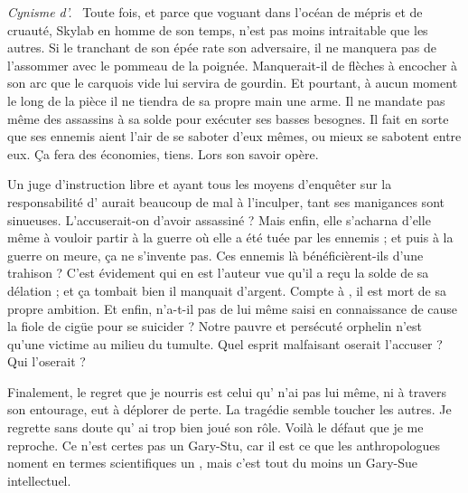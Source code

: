 {\em\normalsize Cynisme d’\elena{}.}~
Toute fois, et parce que voguant dans l’océan de mépris et de cruauté, \elena{} Skylab en homme de son temps, n’est pas moins intraitable que les autres. Si le tranchant de son épée rate son adversaire, il ne manquera pas de l’assommer avec le pommeau de la poignée. Manquerait-il de flèches à encocher à son arc que le carquois vide lui servira de gourdin. Et pourtant, à aucun moment le long de la pièce il ne tiendra de sa propre main une arme. Il ne mandate pas même des assassins à sa solde pour exécuter ses basses besognes. Il fait en sorte que ses ennemis aient l’air de se saboter d’eux mêmes, ou mieux se sabotent entre eux. Ça fera des économies, tiens. Lors son savoir opère.

Un juge d’instruction libre et ayant tous les moyens d’enquêter sur la responsabilité d’\elena{} aurait beaucoup de mal à l’inculper, tant ses manigances sont sinueuses. L’accuserait-on d’avoir assassiné \princesse ? Mais enfin, elle s’acharna d’elle même à vouloir partir à la guerre où elle a été tuée par les ennemis ; et puis à la guerre on meure, ça ne s’invente pas. Ces ennemis là bénéficièrent-ils d’une trahison ? C’est évidement \vladimir{} qui en est l’auteur vue qu’il a reçu la solde de sa délation ; et ça tombait bien il manquait d’argent. Compte à \general, il est mort de sa propre ambition. Et enfin, \roi{} n’a-t-il pas de lui même saisi en connaissance de cause la fiole de cigüe pour se suicider ? Notre pauvre et persécuté orphelin \elena{} n’est qu’une victime au milieu du tumulte. Quel esprit malfaisant oserait l’accuser ? Qui l’oserait ?

Finalement, le regret que je nourris est celui qu’\elena{} n’ai pas lui même, ni à travers son entourage, eut à déplorer de perte. La tragédie semble toucher les autres. Je regrette sans doute qu’\elena{} ai trop bien joué son rôle. Voilà le défaut que je me reproche. Ce n’est certes pas un Gary-Stu, car il est ce que les anthropologues noment en termes scientifiques un , mais c’est tout du moins un Gary-Sue intellectuel.


